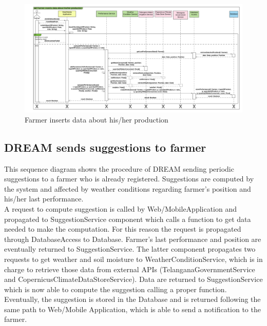 \newpage
\begin{landscape}
\begin{figure}[h]
\vspace*{-2cm}
\noindent
\centering
\centerline{\includegraphics[scale= 0.108]{./Images/Sequence diagram/Farmer inserts data about his_her production.png}}
    \caption{Farmer inserts data about his/her production}
    \vspace*{-12cm}
\end{figure}
\fillandplacepagenumber
\end{landscape}

\subsection{DREAM sends suggestions to farmer}

This sequence diagram shows the procedure of DREAM sending periodic suggestions to a farmer who is already registered. Suggestions are computed by the system and affected by weather conditions regarding farmer's position and his/her last performance.\\
A request to compute suggestion is called by Web/MobileApplication and propagated to SuggestionService component which calls a function to get data needed to make the computation. For this reason the request is propagated through DatabaseAccess to Database. Farmer's last performance and position are eventually returned to SuggestionService. The latter component propagates two requests to get weather and soil moisture to WeatherConditionService, which is in charge to retrieve those data from external APIs (TelanganaGovernmentService and CopernicusClimateDataStoreService). Data are returned to SuggestionService which is now able to compute the suggestion calling a proper function. \\
Eventually, the suggestion is stored in the Database and is returned following the same path to Web/Mobile Application, which is able to send a notification to the farmer.

